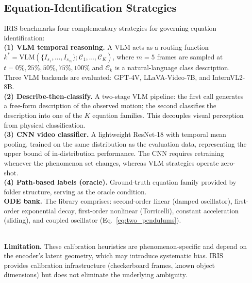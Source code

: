 \documentclass[runningheads]{llncs}
\begin{document}
\subsection{Equation-Identification Strategies}
\label{sec:baseline_eq_id}

IRIS benchmarks four complementary strategies for governing-equation identification:
\\
\noindent
\textbf{(1) VLM temporal reasoning.} A VLM acts as a routing function $k^* = \mathrm{VLM}(\{I_{s_1}, \ldots, I_{s_m}\}; \mathcal{C}_1, \ldots, \mathcal{C}_K)$, where $m{=}5$ frames are sampled at $t = 0\%, 25\%, 50\%, 75\%, 100\%$ and $\mathcal{C}_k$ is a natural-language class description. Three VLM backends are evaluated: GPT-4V, LLaVA-Video-7B, and InternVL2-8B.
\\
\noindent
\textbf{(2) Describe-then-classify.} A two-stage VLM pipeline: the first call generates a free-form description of the observed motion; the second classifies the description into one of the $K$ equation families. This decouples visual perception from physical classification.
\\
\noindent
\textbf{(3) CNN video classifier.} A lightweight ResNet-18 with temporal mean pooling, trained on the same distribution as the evaluation data, representing the upper bound of in-distribution performance. The CNN requires retraining whenever the phenomenon set changes, whereas VLM strategies operate zero-shot.
\\
\noindent
\textbf{(4) Path-based labels (oracle).} Ground-truth equation family provided by folder structure, serving as the oracle condition.
\\
\noindent
\textbf{ODE bank.} The library comprises: second-order linear (damped oscillator), first-order exponential decay, first-order nonlinear (Torricelli), constant acceleration (sliding), and coupled oscillator (Eq.~\ref{eq:two_pendulums}).


\\
\noindent
\textbf{Limitation.} These calibration heuristics are phenomenon-specific and depend on the encoder's latent geometry, which may introduce systematic bias. IRIS provides calibration infrastructure (checkerboard frames, known object dimensions) but does not eliminate the underlying ambiguity. 
\end{document}
